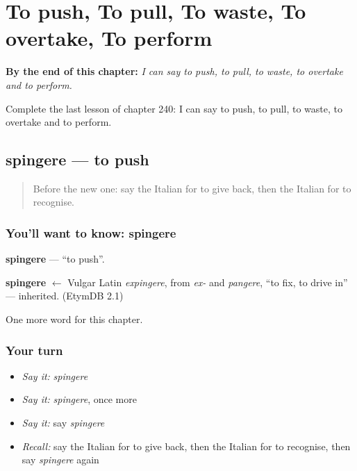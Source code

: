 
\chapter{To push, To pull, To waste, To overtake, To perform}
\label{ch:it-to-push-to-pull-to-waste-to-overtake-to-perform}

\begin{chapteropening}
\textbf{By the end of this chapter:} \emph{I can say to push, to pull, to waste, to overtake and to perform.}

Complete the last lesson of chapter 240: I can say to push, to pull, to waste, to overtake and to perform.
\end{chapteropening}

\section[spingere]{spingere — to push}

\label{lesson:IT-C240-spingere}



\begin{quote}
Before the new one: say the Italian for to give back, then the Italian for to recognise.
\end{quote}

\subsection*{You'll want to know: spingere}
\textbf{spingere} — \textquotedblleft{}to push\textquotedblright{}.

\begin{cousinweb}
\textbf{spingere} $\leftarrow$ Vulgar Latin \emph{expingere}, from \emph{ex-} and \emph{pangere}, \textquotedblleft{}to fix, to drive in\textquotedblright{} — inherited. (EtymDB 2.1)
\end{cousinweb}

\begin{grammarlens}[title={What you've built}]
One more word for this chapter.
\end{grammarlens}

\subsection*{Your turn}
\begin{itemize}
\raggedright
  \item \emph{Say it:} \emph{spingere}
  \item \emph{Say it:} \emph{spingere}, once more
  \item \emph{Say it:} say \emph{spingere}
  \item \emph{Recall:} say the Italian for to give back, then the Italian for to recognise, then say \emph{spingere} again
\end{itemize}

